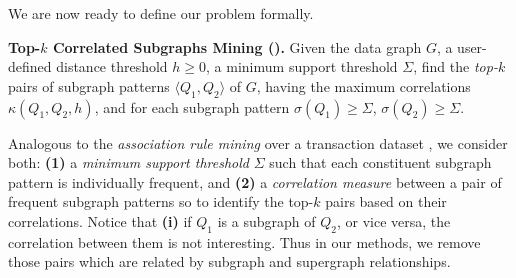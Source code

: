 We are now ready to define our problem formally.
%
\begin{problem}
\label{prob:top-k}
{\bf {\sf Top-$k$} Correlated Subgraphs Mining (}{}{\bf).}
Given the data graph $G$, a user-defined distance threshold $h\ge0$, a minimum support threshold $\Sigma$, find the {\em top-$k$} pairs of subgraph patterns $\langle Q_1, Q_2 \rangle$ of $G$, having the
maximum correlations $\kappa(Q_1,Q_2,h)$, and for each subgraph pattern $\sigma(Q_1)\ge \Sigma$, $\sigma(Q_2)\ge \Sigma$.
\end{problem}

Analogous to the {\em association rule mining} over a transaction dataset \cite{AS94}, we consider both: {\bf (1)} a {\em minimum
support threshold} $\Sigma$ such that each constituent subgraph pattern is individually frequent, and {\bf (2)} a {\em correlation
measure} between a pair of frequent subgraph patterns so to identify the top-$k$ pairs based on their
correlations. Notice that {\bf (i)} if $Q_1$ is a subgraph of $Q_2$, or vice versa, the correlation between them is not interesting.
Thus in our methods, we remove those pairs which are related by subgraph and supergraph relationships.
